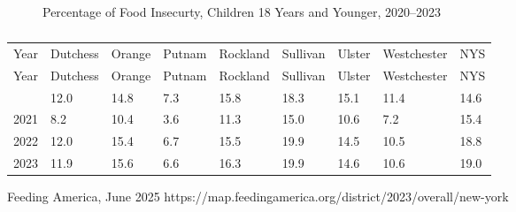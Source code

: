 \documentclass[
  english,
  letterpaper,
]{report}
\begin{document}
\begin{figure}


\caption{\label{fig-childhood-food-insecurity}Percentage of Food
Insecurty, Children 18 Years and Younger, 2020--2023}

\end{figure}%

\begin{longtable}[]{@{}lllllllll@{}}

\caption{\label{tbl-childhood-food-insecurity}Percentage of Food
Insecurty, Children 18 Years and Younger, 2020--2023}

\tabularnewline

\caption{}\label{T_586c7}\tabularnewline
\toprule\noalign{}
Year & Dutchess & Orange & Putnam & Rockland & Sullivan & Ulster &
Westchester & NYS \\
\midrule\noalign{}
\endfirsthead
\toprule\noalign{}
Year & Dutchess & Orange & Putnam & Rockland & Sullivan & Ulster &
Westchester & NYS \\
\midrule\noalign{}
\endhead
\bottomrule\noalign{}
\endlastfoot
2020 & 12.0 & 14.8 & 7.3 & 15.8 & 18.3 & 15.1 & 11.4 & 14.6 \\
2021 & 8.2 & 10.4 & 3.6 & 11.3 & 15.0 & 10.6 & 7.2 & 15.4 \\
2022 & 12.0 & 15.4 & 6.7 & 15.5 & 19.9 & 14.5 & 10.5 & 18.8 \\
2023 & 11.9 & 15.6 & 6.6 & 16.3 & 19.9 & 14.6 & 10.6 & 19.0 \\

\end{longtable}

\begin{tcolorbox}[enhanced jigsaw, breakable, leftrule=.75mm, title=\textcolor{quarto-callout-note-color}{\faInfo}\hspace{0.5em}{Source}, bottomrule=.15mm, opacityback=0, left=2mm, colback=white, bottomtitle=1mm, coltitle=black, colbacktitle=quarto-callout-note-color!10!white, colframe=quarto-callout-note-color-frame, opacitybacktitle=0.6, toptitle=1mm, titlerule=0mm, arc=.35mm, rightrule=.15mm, toprule=.15mm]

Feeding America, June 2025
https://map.feedingamerica.org/district/2023/overall/new-york

\end{tcolorbox}
\end{document}
